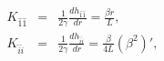 \begin{equation}
\begin{array}{rcl}
K_{\hat{1}\hat{1}}&=&\frac{1}{2\gamma}\frac{dh_{\hat{1}\hat{1}}}{dr}=\frac{\beta
r}{L},\\
K_{\hat{i}\hat{i}}&=&\frac{1}{2\gamma}\frac{dh_{\hat{i}\hat{i}}}{dr}=\frac{\beta}{4L}(\beta^{2})',\\
\end{array}
\end{equation}

